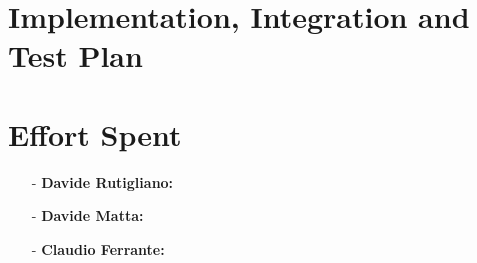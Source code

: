 \documentclass[a4paper]{article}
\begin{document}
\newpage
\section{Implementation, Integration and Test Plan}

\newpage
\section{Effort Spent}
    \begin{itemize}
        \item[-] \textbf{Davide Rutigliano: }
        
        \item[-] \textbf{Davide Matta: }
        
        \item[-] \textbf{Claudio Ferrante: }
    \end{itemize}
\end{document}
